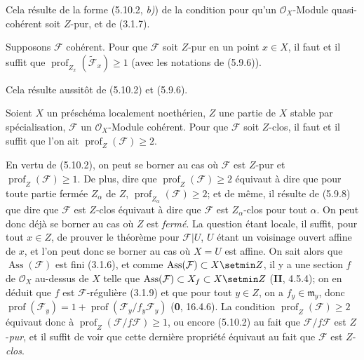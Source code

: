 
Cela résulte de la forme (5.10.2, \emph{b)}) de la condition pour qu'un
$\mathcal O_X$-Module quasi-cohérent soit $Z$-pur, et de (3.1.7).

\begin{corollary}[5.10.4]
\label{IV.2.s5.10.4-fr}
Supposons $\mathcal F$ cohérent. Pour que $\mathcal F$ soit $Z$-pur en un
point $x\in X$, il faut et il suffit que
$\operatorname{prof}_{Z_x}(\widetilde{\mathcal F}_x)\geq1$
\textup{(}avec les notations de \textup{(5.9.6))}.
\end{corollary}

Cela résulte aussitôt de (5.10.2) et (5.9.6).

\begin{theorem}[5.10.5]
Soient $X$ un préschéma localement noethérien, $Z$ une partie de $X$ stable
par spécialisation, $\mathcal F$ un $\mathcal O_X$-Module cohérent. Pour que
$\mathcal F$ soit $Z$-clos, il faut et il suffit que l'on ait
$\operatorname{prof}_Z(\mathcal F)\geq2$.
\end{theorem}

En vertu de (5.10.2), on peut se borner au cas où $\mathcal F$ est $Z$-pur
et $\operatorname{prof}_Z(\mathcal F)\geq1$. De plus, dire que
$\operatorname{prof}_Z(\mathcal F)\geq2$ équivaut à dire que pour toute partie
fermée $Z_\alpha$ de $Z$, $\operatorname{prof}_{Z_\alpha}(\mathcal F)\geq2$;
et de même, il résulte de (5.9.8) que dire que $\mathcal F$ est $Z$-clos
équivaut à dire que $\mathcal F$ est $Z_\alpha$-clos pour tout $\alpha$. On
peut donc déjà se borner au cas où $Z$ est \emph{fermé}. La question étant locale,
il suffit, pour tout $x\in Z$, de prouver le théorème pour $\mathcal F|U$,
$U$ étant un voisinage ouvert affine de $x$, et l'on peut donc se borner au
cas où $X=U$ est affine. On sait alors que $\operatorname{Ass}(\mathcal F)$
est fini (3.1.6), et comme
$\operatorname{Ass}(\mathcal F)\subset X\setmin Z$, il y a une section $f$ de
$\mathcal O_X$ au-dessus de $X$ telle que
$\operatorname{Ass}(\mathcal F)\subset X_f\subset X\setmin Z$ (\textbf{II}, 4.5.4); on en
déduit que $f$ est $\mathcal F$-régulière (3.1.9) et que pour tout $y\in Z$,
on a $f_y\in\mathfrak m_y$, donc
$\operatorname{prof}(\mathcal F_y)
=1+\operatorname{prof}(\mathcal F_y/f_y\mathcal F_y)$
(\textbf{0}, 16.4.6).
La condition $\operatorname{prof}_Z(\mathcal F)\geq2$ équivaut donc à
$\operatorname{prof}_Z(\mathcal F/f\mathcal F)\geq1$, ou encore (5.10.2) au
fait que $\mathcal F/f\mathcal F$ est $Z$-\emph{pur}, et il suffit de voir que cette
dernière propriété équivaut au fait que $\mathcal F$ est $Z$-\emph{clos}.


